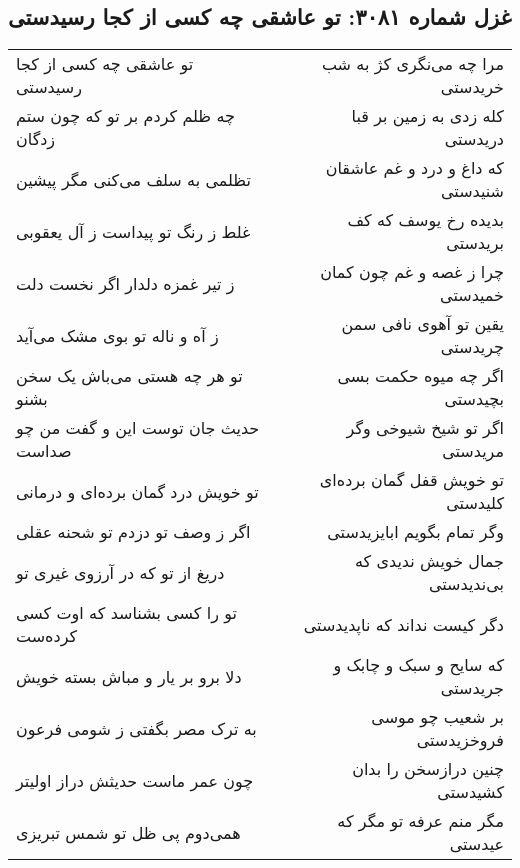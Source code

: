 \begin{center}
\section*{غزل شماره ۳۰۸۱: تو عاشقی چه کسی از کجا رسیدستی}
\label{sec:3081}
\begin{longtable}{l p{0.5cm} r}
تو عاشقی چه کسی از کجا رسیدستی
&&
مرا چه می‌نگری کژ به شب خریدستی
\\
چه ظلم کردم بر تو که چون ستم زدگان
&&
کله زدی به زمین بر قبا دریدستی
\\
تظلمی به سلف می‌کنی مگر پیشین
&&
که داغ و درد و غم عاشقان شنیدستی
\\
غلط ز رنگ تو پیداست ز آل یعقوبی
&&
بدیده رخ یوسف که کف بریدستی
\\
ز تیر غمزه دلدار اگر نخست دلت
&&
چرا ز غصه و غم چون کمان خمیدستی
\\
ز آه و ناله تو بوی مشک می‌آید
&&
یقین تو آهوی نافی سمن چریدستی
\\
تو هر چه هستی می‌باش یک سخن بشنو
&&
اگر چه میوه حکمت بسی بچیدستی
\\
حدیث جان توست این و گفت من چو صداست
&&
اگر تو شیخ شیوخی وگر مریدستی
\\
تو خویش درد گمان برده‌ای و درمانی
&&
تو خویش قفل گمان برده‌ای کلیدستی
\\
اگر ز وصف تو دزدم تو شحنه عقلی
&&
وگر تمام بگویم ابایزیدستی
\\
دریغ از تو که در آرزوی غیری تو
&&
جمال خویش ندیدی که بی‌ندیدستی
\\
تو را کسی بشناسد که اوت کسی کرده‌ست
&&
دگر کیست نداند که ناپدیدستی
\\
دلا برو بر یار و مباش بسته خویش
&&
که سایح و سبک و چابک و جریدستی
\\
به ترک مصر بگفتی ز شومی فرعون
&&
بر شعیب چو موسی فروخزیدستی
\\
چون عمر ماست حدیثش دراز اولیتر
&&
چنین درازسخن را بدان کشیدستی
\\
همی‌دوم پی ظل تو شمس تبریزی
&&
مگر منم عرفه تو مگر که عیدستی
\\
\end{longtable}
\end{center}
